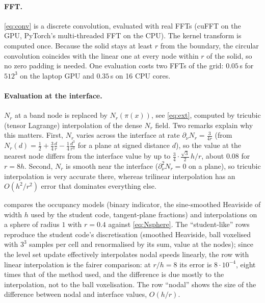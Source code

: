\documentclass[11pt]{article}
\newcommand{\N}{N_r}
\begin{document}
\paragraph{FFT.} \eqref{eq:conv} is a discrete convolution, evaluated with real FFTs (cuFFT on the GPU,
PyTorch's multi-threaded FFT on the CPU). The kernel transform is computed once. Because the solid
stays at least $r$ from the boundary, the circular convolution coincides with the linear one at every node
within $r$ of the solid, so no zero padding is needed. One evaluation costs two FFTs of the grid:
$0.05$\,s for $512^3$ on the laptop GPU and $0.35$\,s on 16 CPU cores.

\paragraph{Evaluation at the interface.} $\N$ at a band node is replaced by $\N(\pi(x))$, see
\eqref{eq:ext}, computed by tricubic (tensor Lagrange) interpolation of the dense $\N$ field. Two remarks
explain why this matters. First, $\N$ varies across the interface at rate $\partial_\nu\N=\frac{3}{4r}$
(from $\N(d)=\frac12+\frac34\frac dr-\frac14\frac{d^3}{r^3}$ for a plane at signed distance $d$), so the
value at the nearest node differs from the interface value by up to $\frac34\cdot\frac{\sqrt3}2\,h/r$,
about $0.08$ for $r=8h$. Second, $\N$ is smooth near the interface ($\partial^2_\nu\N=0$ on a plane), so
tricubic interpolation is very accurate there, whereas trilinear interpolation has an $O(h^2/r^2)$ error
that dominates everything else.

 compares the occupancy models (binary indicator, the sine-smoothed Heaviside of width $h$
used by the student code, tangent-plane fractions) and interpolations on a sphere of radius $1$ with
$r=0.4$ against \eqref{eq:Nsphere}. The ``student-like'' rows reproduce the student code's discretisation
(smoothed Heaviside, ball voxelised with $3^3$ samples per cell and renormalised by its sum, value at the
nodes); since the level set update effectively interpolates nodal speeds linearly, the row with linear
interpolation is the fairer comparison: at $r/h=8$ its error is $8\cdot10^{-4}$, eight times that of the
method used, and the difference is due mostly to the interpolation, not to the ball voxelisation. The row
``nodal'' shows the size of the difference between nodal and interface values, $O(h/r)$.

\begin{table}[h]
\centering\footnotesize\setlength{\tabcolsep}{3.5pt}

\caption{Maximal error of $\N$ over $5000$ points of a sphere ($R=1$, $r=0.4$, exact value
$0.575$) as a function of $r/h$. ``planes'': tangent-plane cell fractions; ``Heaviside'': sine-smoothed
Heaviside of half-width $h$; ``binary'': $\mathbf 1_{\phi<0}$; ``student-like'': smoothed Heaviside with
a $3^3$-supersampled ball renormalised by its sum. The used method (first row) has $O(h^2)$ error and
essentially no bias (last row).}
\label{tab:N}
\end{table}
\end{document}
